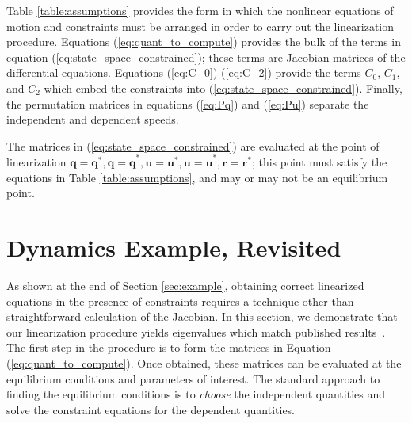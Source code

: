 \documentclass[smallcondensed,final]{svjour3}                     %
\begin{document}
Table \ref{table:assumptions} provides the form in which the nonlinear
equations of motion and constraints must be arranged in order to carry out the
linearization procedure.  Equations (\ref{eq:quant_to_compute}) provides the
bulk of the terms in equation (\ref{eq:state_space_constrained}); these terms
are Jacobian matrices of the differential equations. Equations
(\ref{eq:C_0})-(\ref{eq:C_2}) provide the terms $C_0$, $C_1$, and $C_2$ which
embed the constraints into (\ref{eq:state_space_constrained}). Finally, the
permutation matrices in equations (\ref{eq:Pq}) and (\ref{eq:Pu}) separate the
independent and dependent speeds.

The matrices in (\ref{eq:state_space_constrained}) are evaluated at the point
of linearization $\bm{q}=\bm{q}^*, \bm{\dot{q}}=\bm{\dot{q}}^*,
\bm{u}=\bm{u}^*, \bm{\dot{u}}=\bm{\dot{u}}^*, \bm{r}=\bm{r}^*$; this point must
satisfy the equations in Table \ref{table:assumptions}, and may or may not be
an equilibrium point.

\section{Dynamics Example, Revisited}
\label{sec:example_revisited}
As shown at the end of Section \ref{sec:example}, obtaining correct linearized
equations in the presence of constraints requires a technique other than
straightforward calculation of the Jacobian. In this section, we demonstrate
that our linearization procedure yields eigenvalues which match published
results~\cite{Schwab2003,Kane1985,Neimark1972}. The first step in the procedure
is to form the matrices in Equation (\ref{eq:quant_to_compute}). Once obtained,
these matrices can be evaluated at the equilibrium conditions and parameters of
interest.  The standard approach to finding the equilibrium conditions is to
\textit{choose} the independent quantities and solve the constraint equations
for the dependent quantities.
\end{document}
